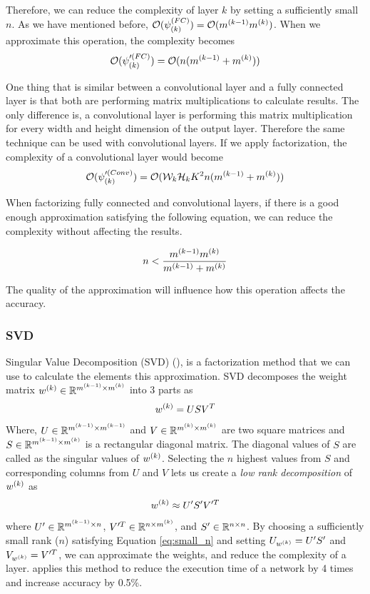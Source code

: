 Therefore, we can reduce the complexity of layer $k$ by setting a sufficiently small $n$. As we have mentioned before, $\mathcal{O}(\psi^{(FC)}_{(k)}) = \mathcal{O}(m^{(k-1)}m^{(k)})$. When we approximate this operation, the complexity becomes
$$\mathcal{O}(\psi'^{(FC)}_{(k)}) = \mathcal{O}(n(m^{(k-1)}+m^{(k)}))$$

One thing that is similar between a convolutional layer and a fully connected layer is that both are performing matrix multiplications to calculate results. The only difference is, a convolutional layer is performing this matrix multiplication for every width and height dimension of the output layer. Therefore the same technique can be used with convolutional layers. If we apply factorization, the complexity of a convolutional layer would become
$$ \mathcal{O}(\psi'^{(Conv)}_{(k)}) =  \mathcal{O}(\mathcal{W}_{k}\mathcal{H}_{k}K^2n(m^{(k-1)}+m^{(k)})) $$

When factorizing fully connected and convolutional layers, if there is a good enough approximation satisfying the following equation, we can reduce the complexity without affecting the results.

\begin{equation}
\label{eq:small_n}
n < \frac{m^{(k-1)}m^{(k)}}{m^{(k-1)}+m^{(k)}}
\end{equation}

The quality of the approximation will influence how this operation affects the accuracy.

\subsubsection{SVD}
Singular Value Decomposition (SVD) (\cite{golub1970singular}), is a factorization method that we can use to calculate the elements this approximation. SVD decomposes the weight matrix $w^{(k)} \in \mathbb{R}^{m^{(k-1)} \times m^{(k)}}$ into $3$ parts as
$$ w^{(k)} = USV^T $$
Where, $U \in \mathbb{R}^{m^{(k-1)} \times m^{(k-1)}}$ and $V \in \mathbb{R}^{m^{(k)} \times m^{(k)}}$ are two square matrices and $S \in \mathbb{R}^{m^{(k-1)} \times m^{(k)}}$ is a rectangular diagonal matrix. The diagonal values of $S$ are called as the singular values of $w^{(k)}$. Selecting the $n$ highest values from $S$ and corresponding columns from $U$ and $V$ lets us create a \textit{low rank decomposition} of $w^{(k)}$ as
$$ w^{(k)} \approx U'S'V'^T $$
where $U' \in \mathbb{R}^{m^{(k-1)} \times n}$, $V'^T \in \mathbb{R}^{n \times m^{(k)}}$, and $S' \in \mathbb{R}^{n \times n}$. By choosing a sufficiently small rank ($n$) satisfying Equation \ref{eq:small_n} and setting $U_{w^{(k)}}=U'S'$ and $V_{w^{(k)}} = V'^T$, we can approximate the weights, and reduce the complexity of a layer. \cite{zhang2016accelerating} applies this method to reduce the execution time of a network by 4 times and increase accuracy by 0.5\%.

